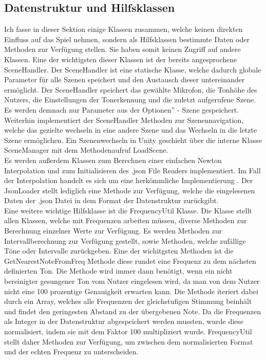 \subsection*{Datenstruktur und Hilfsklassen}
Ich fasse in dieser Sektion einige Klassen zusammen, welche keinen direkten Einfluss auf das Spiel nehmen, sondern als Hilfsklassen bestimmte Daten oder Methoden zur Verfügung stellen. Sie haben somit keinen Zugriff auf andere Klassen. Eine der wichtigsten dieser Klassen ist der bereits angesprochene SceneHandler. Der SceneHandler ist eine statische Klasse, welche dadurch globale Parameter für alle Szenen speichert und den Austausch dieser untereinander ermöglicht. Der SceneHandler speichert das gewählte Mikrofon, die Tonhöhe des Nutzers, die Einstellungen der Tonerkennung und die zuletzt aufgerufene Szene. Es werden demnach nur Parameter aus der \glqq Optionen'' - Szene gespeichert. Weiterhin implementiert der SceneHandler Methoden zur Szenennavigation, welche das gezielte wechseln in eine andere Szene und das Wechseln in die letzte Szene ermöglichen. Ein Szenenwechseln in Unity geschieht über die interne Klasse SceneManager mit dem Methodenaufruf LoadScene. \\
Es werden außerdem Klassen zum Berechnen einer einfachen Newton Interpolation und zum Initialisieren des .json File Readers implementiert. Im Fall der Interpolation handelt es sich um eine herkömmliche Implementierung \cite{newtonInterpolation}. Der JsonLoader stellt lediglich eine Methode zur Verfügung, welche die eingelesenen Daten der .json Datei in dem Format der Datenstruktur zurückgibt. \\
Eine weitere wichtige Hilfsklasse ist die FrequencyUtil Klasse. Die Klasse stellt allen Klassen, welche mit Frequenzen arbeiten müssen, diverse Methoden zur Berechnung einzelner Werte zur Verfügung. Es werden Methoden zur Intervallberechnung zur Verfügung gestellt, sowie Methoden, welche zufällige Töne oder Intervalle zurückgeben. Eine der wichitgsten Methoden ist die GetNearestNoteFromFreq Methode diese rundet eine Frequenz zu dem nächsten definierten Ton. Die Methode wird immer dann benötigt, wenn ein nicht bereinigter gesungener Ton vom Nutzer eingelesen wird, da man von dem Nutzer nicht eine 100 prozentige Genauigkeit erwarten kann. Die Methode iteriert dabei durch ein Array, welches alle Frequenzen der gleichstufigen Stimmung beinhält und findet den geringesten Abstand zu der übergebenen Note. Da die Frequenzen als Integer in der Datenstruktur abgespeichert werden mussten, wurde diese normalisiert, indem sie mit dem Faktor 100 multipliziert wurde. FrequencyUtil stellt daher Methoden zur Verfügung, um zwischen dem normalisierten Format und der echten Frequenz zu unterscheiden. \\
